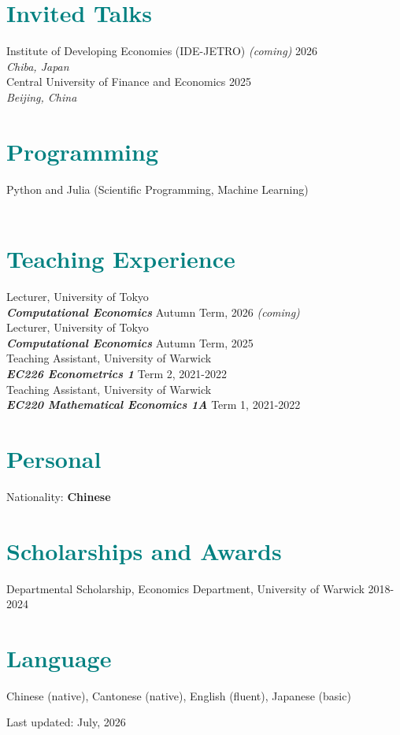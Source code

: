 \documentclass[A4,11pt]{article}
\begin{document}
\section{\textbf{\Large{\textcolor{teal}{Invited Talks}}}}
\smallskip\smallskip

Institute of Developing Economies (IDE-JETRO) \textit{(coming)} \hfill{2026} \\
\textit{Chiba, Japan}\\
\smallskip
Central University of Finance and Economics \hfill{2025} \\
\textit{Beijing, China}

\section{\textbf{\Large{\textcolor{teal}{Programming}}}}
{Python and Julia (Scientific Programming, Machine Learning)}\\
\smallskip
{}\\

\section{\textbf{\Large{\textcolor{teal}{Teaching Experience}}}}
\smallskip\smallskip
Lecturer, University of Tokyo \hfill{} \\
\textbf{\textit{Computational Economics}} \hfill{Autumn Term, 2026 \textit{(coming)}} \\
\smallskip
Lecturer, University of Tokyo \hfill{} \\
\textbf{\textit{Computational Economics}} \hfill{Autumn Term, 2025} \\
\smallskip
Teaching Assistant, University of Warwick \hfill{} \\
\textbf{\textit{EC226 Econometrics 1}} \hfill{Term 2, 2021-2022} \\
\smallskip
Teaching Assistant, University of Warwick \hfill{} \\
\textbf{\textit{EC220 Mathematical Economics 1A}} \hfill{Term 1, 2021-2022} 

\section{\textbf{\Large{\textcolor{teal}{Personal}}}}
Nationality: \textbf{Chinese}\hfill{}

\section{\textbf{\Large{\textcolor{teal}{Scholarships and Awards}}}}
\smallskip\smallskip
Departmental Scholarship, Economics Department, University of Warwick \hfill{2018-2024}

\section{\textbf{\Large{\textcolor{teal}{Language}}}}
Chinese (native), Cantonese (native), English (fluent), Japanese (basic)

\vspace{1cm}

\hfill \noindent Last updated: July,  2026

\end{document}
